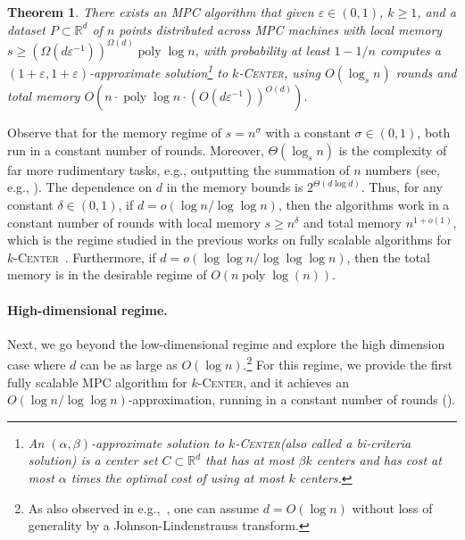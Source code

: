 \documentclass[11pt,letterpaper]{article}
\theoremstyle{plain}
\newtheorem{theorem}{Theorem}[section]
\theoremstyle{definition}
\theoremstyle{remark}
\newcommand{\ProblemName}[1]{\textsc{#1}}
\newcommand{\kCenter}{$k$-\ProblemName{Center}\xspace}
\DeclareMathOperator{\poly}{poly}
\renewcommand{\epsilon}{\ensuremath{\varepsilon}}
\let\epsilon\varepsilon
\begin{document}
\begin{theorem}
    \label{thm:low_dim_bicrit}
There exists an MPC algorithm that given $\epsilon\in (0,1)$, $k \ge 1$, and a dataset $P \subset \mathbb{R}^d$ of $n$ points  distributed across MPC machines with local memory $s \geq (\Omega(d \epsilon^{-1}))^{\Omega(d)} \poly\log n$,
with probability at least $1-1/n$ computes
a $(1 + \epsilon, 1 + \epsilon)$-approximate solution\footnote{An \emph{$(\alpha, \beta)$-approximate} solution to \kCenter (also called a \emph{bi-criteria} solution) is a center set $C \subset \mathbb{R}^d$ that has at most $\beta k$ centers and has cost at most $\alpha$ times the optimal cost of using at most $k$ centers.}
to \kCenter, using $O(\log_s n)$ rounds and total memory $O(n \cdot \poly\log n \cdot (O(d \epsilon^{-1}))^{O(d)})$.
\end{theorem}



Observe that for the memory regime of $s = n^{\sigma}$ with a constant $\sigma\in(0,1)$,
both  run in a constant number of rounds. Moreover, $\Theta(\log_s n)$ is the complexity of far more rudimentary tasks, e.g., outputting the summation of $n$ numbers (see, e.g., \cite{RVW18}).
The dependence on $d$ in the memory bounds is $2^{\Theta(d \log d)}$.
Thus, for any constant $\delta \in (0,1)$, if $d = o(\log n/\log\log n)$, then the algorithms work in a constant number of rounds with local memory $s \ge n^{\delta}$ and total memory $n^{1+o(1)}$,
which is the regime studied in the previous works on fully scalable algorithms for \kCenter~\cite{BEFM21,CCM23}. Furthermore, if $d = o(\log\log n/\log\log\log n)$, then the total memory is in the desirable regime of $O(n \poly\log(n))$.




\paragraph{High-dimensional regime.}
Next, we go beyond the low-dimensional regime and explore the high dimension case where $d$ can be as large as $O(\log n)$.\footnote{As also observed in e.g.,~\cite{Cohen-AddadLNSS21,CGJKV24},
one can assume $d = O(\log n)$ without loss of generality by a Johnson-Lindenstrauss transform.
}
For this regime, we provide the first fully scalable MPC algorithm for \kCenter, and it achieves an $O(\log n/ \log \log n)$-approximation, running in a constant number of rounds ().
\end{document}
